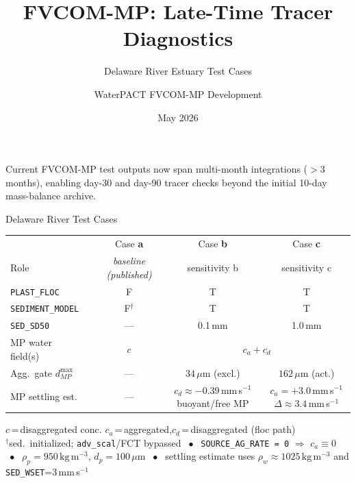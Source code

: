 \documentclass[aspectratio=169,10pt]{beamer}
\title{FVCOM-MP: Late-Time Tracer Diagnostics}
\subtitle{Delaware River Estuary Test Cases}
\author{WaterPACT FVCOM-MP Development}
\date{May 2026}
\newcommand{\ca}{\textcolor{OliveGreen}{\textbf{a}}}
\newcommand{\cb}{\textcolor{NavyBlue}{\textbf{b}}}
\newcommand{\cc}{\textcolor{BurntOrange}{\textbf{c}}}
\begin{document}
\begin{frame}
  \titlepage

  \vspace{-0.8em}
  \begin{center}
    \colorbox{NavyBlue!10}{%
      \parbox{0.78\textwidth}{\centering\small
        Current FVCOM-MP test outputs now span multi-month integrations
        ($>3$ months), enabling day-30 and day-90 tracer checks beyond the
        initial 10-day mass-balance archive.}}
  \end{center}
\end{frame}

\begin{frame}{Delaware River Test Cases}
  \centering
  \vspace{0.3em}
  \footnotesize
  \begin{tabular}{lcccc}
    \toprule
    & & Case \ca & Case \cb & Case \cc \\
    \cmidrule(lr){3-5}
    Role & & \textit{baseline (published)} & sensitivity b & sensitivity c \\
    \midrule
    \texttt{PLAST\_FLOC}   & & F & T & T \\
    \texttt{SEDIMENT\_MODEL} & & F$^{\dagger}$ & T & T \\
    \texttt{SED\_SD50}     & & --- & 0.1\,mm & 1.0\,mm \\
    MP water field(s)      & & $c$ &
                             \multicolumn{2}{c}{$c_a + c_d$} \\
    Agg.\ gate $d_{MP}^{\max}$ & & --- &
                             $34\,\mu$m (excl.) &
                             $162\,\mu$m (act.) \\
    MP settling est. & & --- &
                             \shortstack{$c_d\approx-0.39$\,mm\,s$^{-1}$\\
                             buoyant/free MP} &
                             \shortstack{$c_a=+3.0$\,mm\,s$^{-1}$\\
                             $\Delta\approx3.4$\,mm\,s$^{-1}$} \\
    \bottomrule
  \end{tabular}

  \vspace{0.5em}
  {\scriptsize
    $c$\,=\,disaggregated conc.\hfill
    $c_a$\,=\,aggregated,\;$c_d$\,=\,disaggregated (floc path)\\[2pt]
    $^{\dagger}$sed.\ initialized; \texttt{adv\_scal}/FCT bypassed
    $\;\bullet\;$
    \texttt{SOURCE\_AG\_RATE\,=\,0} $\Rightarrow$ $c_a\equiv 0$
    $\;\bullet\;$
    $\rho_p=950\,\mathrm{kg\,m^{-3}}$,\; $d_p=100\,\mu\mathrm{m}$
    $\;\bullet\;$
    settling estimate uses $\rho_w\approx1025\,\mathrm{kg\,m^{-3}}$ and
    \texttt{SED\_WSET}=3\,mm\,s$^{-1}$}
\end{frame}
\end{document}
